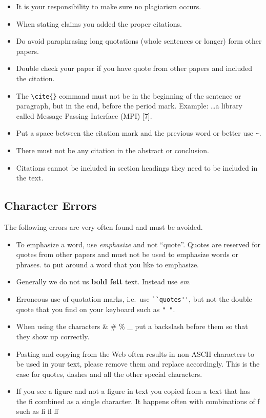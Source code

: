\begin{itemize}[label=$\Box$]
   \item It is your responsibility to make sure no plagiarism occurs. 
   \item When stating claims you added the proper citations. 
   \item Do avoid paraphrasing long quotations (whole sentences or
     longer) form other papers.
   \item Double check your paper if you have quote from other papers
     and included the citation.
   \item The \verb|\cite{}| command must not be in the beginning of
     the sentence or paragraph, but in the end, before the period
     mark. Example: \ldots a library called Message Passing
     Interface (MPI) [7]. 
   \item Put a space between the citation mark and the previous word
     or better use  \verb|~|.
   \item There must not be any citation in the abstract or conclusion.
   \item Citations cannot be included in section headings they need to be
     included in the text. 
\end{itemize}

\subsection{Character Errors}

The following errors are very often found and must be avoided.

\begin{itemize}[label=$\Box$]
    \item To emphasize a word, use \textit{emphasize} and not
      ``quote''. Quotes are reserved for quotes from other papers and
      must not be used to emphasize words or phrases.
      to put around a word that you like to emphasize.
    \item Generally we do not us {\bf bold fett} text. Instead use
      \textit{em}.
    \item Erroneous use of quotation marks, i.e.\ use \verb|``quotes''|,
       but not the double quote that you find on your keyboard such as
       \verb|" "|.
    \item When using the characters \& \# \% \_ put a backslash before
      them so that they show up correctly.
    \item Pasting and copying from the Web often results in non-ASCII
      characters to be used in your text, please remove them and
      replace accordingly. This is the case for quotes, dashes and all
      the other special characters.
    \item If you see a f\hspace{-0.05cm}igure and not a figure in text
      you copied from a text that has the fi combined as a single
      character. It happens often with combinations of f such as fi fl
      ff
\end{itemize}

